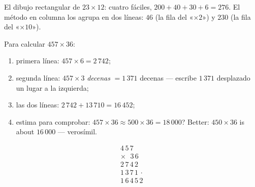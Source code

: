 \begin{omfigure}

{\small El dibujo rectangular de $23 \times 12$: cuatro  fáciles,
$200 + 40 + 30 + 6 = 276$. El método en columna los agrupa en dos
líneas: $46$ (la fila del «$\times 2$») y $230$ (la fila del «$\times 10$»).}
\end{omfigure}

\begin{method}\label{met:g4:mult:column}
Para calcular $457 \times 36$:
\begin{enumerate}
  \item primera línea: $457 \times 6 = 2\,742$;
  \item segunda línea: $457 \times 3$ \emph{decenas} $= 1\,371$ decenas ---
        escribe $1\,371$ desplazado un lugar a la izquierda;
  \item {} las dos líneas: $2\,742 + 13\,710 = 16\,452$;
  \item estima para comprobar: $457 \times 36 \approx 500 \times 36
        = 18\,000$? Better: $450 \times 36$ is about $16\,000$ ---
        verosímil.
\end{enumerate}
\[
\begin{array}{r}
4\,5\,7 \\
\times\ \ \,3\,6 \\
\hline
2\,7\,4\,2 \\
1\,3\,7\,1\,\cdot \\
\hline
1\,6\,4\,5\,2
\end{array}
\]
\end{method}

